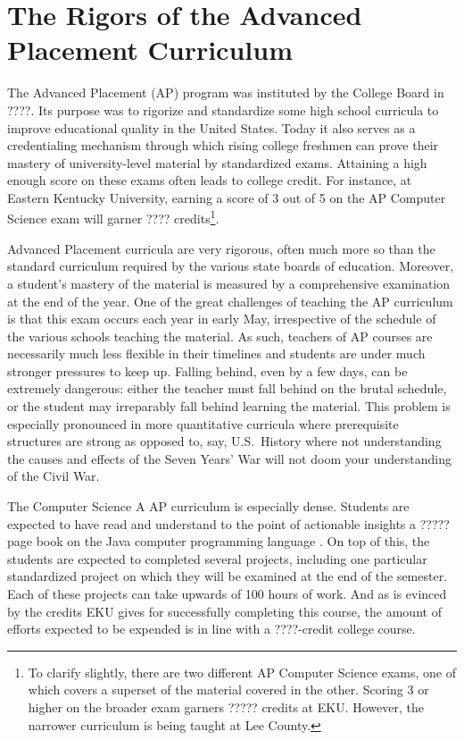 
\section{The Rigors of the Advanced Placement Curriculum}\label{sec:ap}

The Advanced Placement (AP) program was instituted by the College Board in ????.
Its purpose was to rigorize and standardize some high school curricula to
improve educational quality in the United States. Today it also serves as a
credentialing mechanism through which rising college freshmen can prove their
mastery of university-level material by standardized exams. Attaining a high
enough score on these exams often leads to college credit\cite{AP History}.
For instance, at Eastern Kentucky University, earning a score of 3 out of 5
on the AP Computer Science exam will garner ???? credits\footnote{To clarify
slightly, there are two different AP Computer Science exams, one of which covers
a superset of the material covered in the other. Scoring 3 or higher on the
broader exam garners ????? credits at EKU. However, the narrower curriculum is
being taught at Lee County.}.

Advanced Placement curricula are very rigorous, often much more so than the
standard curriculum required by the various state boards of education. Moreover,
a student's mastery of the material is measured by a comprehensive examination
at the end of the year. One of the great challenges of teaching the AP
curriculum is that this exam occurs each year in early May, irrespective of the
schedule of the various schools teaching the material. As such, teachers of AP
courses are necessarily much less flexible in their timelines and students are
under much stronger pressures to keep up. Falling behind, even by a few days,
can be extremely dangerous: either the teacher must fall behind on the brutal
schedule, or the student may irreparably fall behind learning the material. This
problem is especially pronounced in more quantitative curricula where
prerequisite structures are strong as opposed to, say, U.S.~History where
not understanding the causes and effects of the Seven Years' War will not
doom your understanding of the Civil War.

The Computer Science A AP curriculum is especially dense. Students are expected
to have read and understand to the point of actionable insights a ????? page
book on the Java computer programming language \cite{the java book, the ap
curriculum}. On top of this, the students are expected to completed several
projects, including one particular standardized project on which they will be
examined at the end of the semester. Each of these projects can take upwards of
100 hours of work. And as is evinced by the credits EKU gives for successfully
completing this course, the amount of efforts expected to be expended is in
line with a ????-credit college course.

